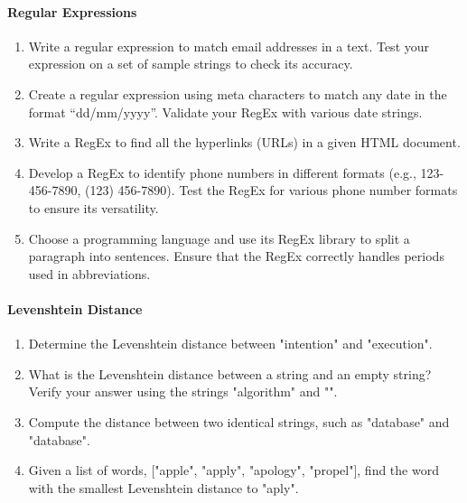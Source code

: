 \paragraph*{Regular Expressions}
\begin{enumerate}
    \item Write a regular expression to match email addresses in a text. Test your expression on a set of sample strings to check its accuracy.
    \item Create a regular expression using meta characters to match any date in the format ``dd/mm/yyyy''. Validate your RegEx with various date strings.
    \item Write a RegEx to find all the hyperlinks (URLs) in a given HTML document.
    \item Develop a RegEx to identify phone numbers in different formats (e.g., 123-456-7890, (123) 456-7890). Test the RegEx for various phone number formats to ensure its versatility.
    \item Choose a programming language and use its RegEx library to split a paragraph into sentences. Ensure that the RegEx correctly handles periods used in abbreviations.
\end{enumerate}
\paragraph*{Levenshtein Distance}
\begin{enumerate}
    \item Determine the Levenshtein distance between "intention" and "execution".
    \item What is the Levenshtein distance between a string and an empty string? Verify your answer using the strings "algorithm" and "".
    \item Compute the distance between two identical strings, such as "database" and "database".
    \item Given a list of words, ["apple", "apply", "apology", "propel"], find the word with the smallest Levenshtein distance to "aply".
\end{enumerate}
